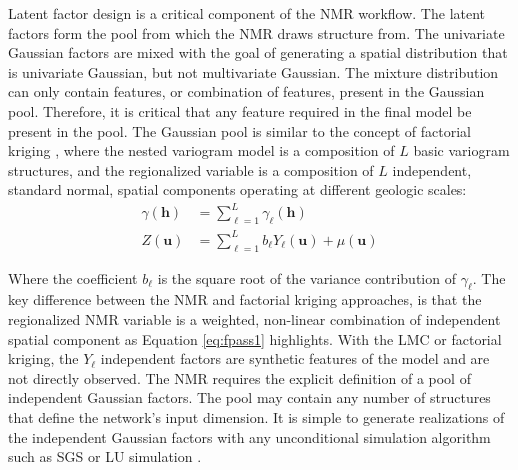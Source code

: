 Latent factor design is a critical component of the \gls{NMR} workflow. The latent factors form the pool from which the \gls{NMR} draws structure from. The univariate Gaussian factors are mixed with the goal of generating a spatial distribution that is univariate Gaussian, but not multivariate Gaussian. The mixture distribution can only contain features, or combination of features, present in the Gaussian pool. Therefore, it is critical that any feature required in the final model be present in the pool. The Gaussian pool is similar to the concept of factorial kriging \citep{goovaerts1997geostatistics}, where the nested variogram model is a composition of $L$ basic variogram structures, and the regionalized variable is a composition of $L$ independent, standard normal, spatial components operating at different geologic scales:
\begin{align}
    \label{eq:gamma_comp}
    \gamma(\mathbf{h}) & = \sum_{\ell=1}^{L} \gamma_{\ell}(\mathbf{h})                     \\
    \label{eq:z_comp}
    Z(\mathbf{u})      & = \sum_{\ell=1}^{L}b_{\ell}Y_{\ell}(\mathbf{u}) + \mu(\mathbf{u})
\end{align}

Where the coefficient $b_{\ell}$ is the square root of the variance contribution of $\gamma_{\ell}$. The key difference between the \gls{NMR} and factorial kriging approaches, is that the regionalized \gls{NMR} variable is a weighted, non-linear combination of independent spatial component as Equation \ref{eq:fpass1} highlights. With the \gls{LMC} or factorial kriging, the $Y_{\ell}$ independent factors are synthetic features of the model and are not directly observed. The \gls{NMR} requires the explicit definition of a pool of independent Gaussian factors. The pool may contain any number of structures that define the network's input dimension. It is simple to generate realizations of the independent Gaussian factors with any unconditional simulation algorithm such as \gls{SGS} \citep{gomez-hernandez1993joint} or LU simulation \citep{davis1987production}.

